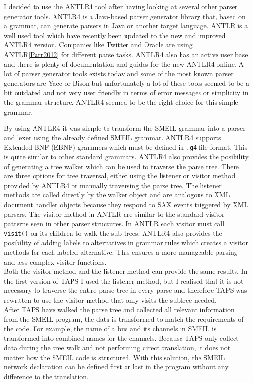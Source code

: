 I decided to use the ANTLR4 tool after having looking at several other parser generator tools. ANTLR4 is a Java-based parser generator library that, based on a grammar, can generate parsers in Java or another target language. ANTLR is a well used tool which have recently been updated to the new and improved ANTLR4 version. Companies like Twitter and Oracle are using ANTLR\ref{Parr2012} for different parse tasks. ANTLR4 also has an active user base and there is plenty of documentation and guides for the new ANTLR4 online. A lot of parser generator tools exists today and some of the most known parser generators are Yacc or Bison but unfortunately a lot of these tools seemed to be a bit outdated and not very user friendly in terms of error messages or simplicity in the grammar structure. ANTLR4 seemed to be the right choice for this simple grammar.

By using ANTLR4 it was simple to transform the SMEIL grammar into a parser and lexer using the already defined SMEIL grammar. ANTLR4 supports Extended BNF (EBNF) grammers which must be defined in \texttt{.g4} file format. This is quite similar to other standard grammars. ANTLR4 also provides the posibility of generating a tree walker which can be used to traverse the parse tree. There are three options for tree traversal, either using the listener or visitor method provided by ANTLR4 or manually traversing the parse tree.
The listener methods are called directly by the walker object and are analogous to XML document handler objects because they respond to SAX events triggered by XML parsers. The visitor method in ANTLR are similar to the standard visitor patterns seen in other parser structures. In ANTLR each visitor must call \texttt{visit()} on its children to walk the sub trees. ANTLR4 also provides the posibility of adding labels to alternatives in grammar rules which creates a visitor methods for each labeled alternative. This ensures a more manageable parsing and less complex visitor functions. \\

Both the visitor method and the listener method can provide the same results. In the first version of TAPS I used the listener method, but I realised that it is not necessary to traverse the entire parse tree in every parse and therefore TAPS was rewritten to use the visitor method that only visits the subtree needed.\\

After TAPS have walked the parse tree and collected all relevant information from the SMEIL program, the data is transformed to match the requirements of the \cspm{} code. For example, the name of a bus and its channels in SMEIL is transformed into combined names for the \cspm{} channels. Because TAPS only collect data during the tree walk and not performing direct translation, it does not matter how the SMEIL code is structured. With this solution, the SMEIL network declaration can be defined first or last in the program without any difference to the translation.\\


